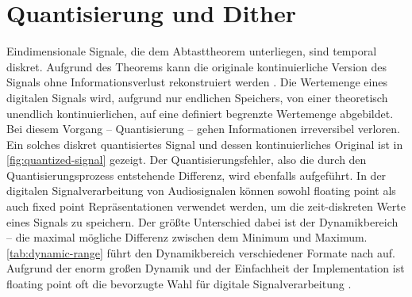 

\thispagestyle{empty}
\vspace*{\fill}
\newpage

\onehalfspacing
{}
\setcounter{page}{1}
\pagestyle{scrheadings}
\mleftright

\section{Quantisierung und Dither}

Eindimensionale Signale, die dem \citeauthor{shannon} Abtasttheorem unterliegen, sind temporal diskret.
Aufgrund des Theorems kann die originale kontinuierliche Version des Signals ohne Informationsverlust rekonstruiert werden \autocite[S. 11 f.]{shannon}.
Die Wertemenge eines digitalen Signals wird, aufgrund nur endlichen Speichers, von einer theoretisch unendlich kontinuierlichen, auf eine definiert begrenzte Wertemenge abgebildet.
Bei diesem Vorgang -- Quantisierung -- gehen Informationen irreversibel verloren.
Ein solches diskret quantisiertes Signal und dessen kontinuierliches Original ist in \autoref{fig:quantized-signal} gezeigt.
Der Quantisierungsfehler, also die durch den Quantisierungsprozess entstehende Differenz, wird ebenfalls aufgeführt.
In der digitalen Signalverarbeitung von Audiosignalen können sowohl \gls{floating point} als auch \gls{fixed point} Repräsentationen verwendet werden, um die zeit-diskreten Werte eines Signals zu speichern.
Der größte Unterschied dabei ist der Dynamikbereich -- die maximal mögliche Differenz zwischen dem Minimum und Maximum.
\autoref{tab:dynamic-range} führt den Dynamikbereich verschiedener Formate nach \citeauthor{dsp-guide} \autocite{dsp-guide} auf.
Aufgrund der enorm großen Dynamik und der Einfachheit der Implementation ist \gls{floating point} oft die bevorzugte Wahl für digitale Signalverarbeitung \autocite[S. 68 ff.]{dsp-guide}.

